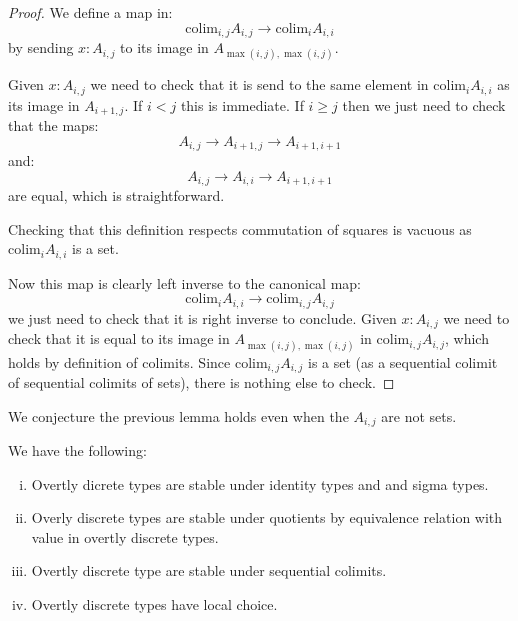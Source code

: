 \begin{proof}
We define a map in:
\[\mathrm{colim}_{i,j} A_{i,j} \to \mathrm{colim}_iA_{i,i}\]
by sending $x:A_{i,j}$ to its image in $A_{\max(i,j),\max(i,j)}$.

Given $x:A_{i,j}$ we need to check that it is send to the same element in $\mathrm{colim}_iA_{i,i}$ as its image in $A_{i+1,j}$. If $i<j$ this is immediate. If $i\geq j$ then we just need to check that the maps:
\[A_{i,j} \to A_{i+1,j} \to A_{i+1,i+1}\]
and:
\[A_{i,j}\to A_{i,i}\to A_{i+1,i+1}\]
are equal, which is straightforward.

Checking that this definition respects commutation of squares is vacuous as $\mathrm{colim}_iA_{i,i}$ is a set.

Now this map is clearly left inverse to the canonical map:
\[ \mathrm{colim}_iA_{i,i}\to\mathrm{colim}_{i,j} A_{i,j} \]
we just need to check that it is right inverse to conclude. Given $x:A_{i,j}$ we need to check that it is equal to its image in $A_{\max(i,j),\max(i,j)}$ in $\mathrm{colim}_{i,j} A_{i,j}$, which holds by definition of colimits. Since $\mathrm{colim}_{i,j} A_{i,j}$ is a set (as a sequential colimit of sequential colimits of sets), there is nothing else to check.
\end{proof}

\begin{remark}
We conjecture the previous lemma holds even when the $A_{i,j}$ are not sets.
\end{remark}

\begin{theorem}
We have the following:
\begin{enumerate}[(i)]
\item Overtly dicrete types are stable under identity types and and sigma types.
\item Overly discrete types are stable under quotients by equivalence relation with value in overtly discrete types.
\item Overtly discrete type are stable under sequential colimits.
\item Overtly discrete types have local choice.
\end{enumerate}
\end{theorem}

